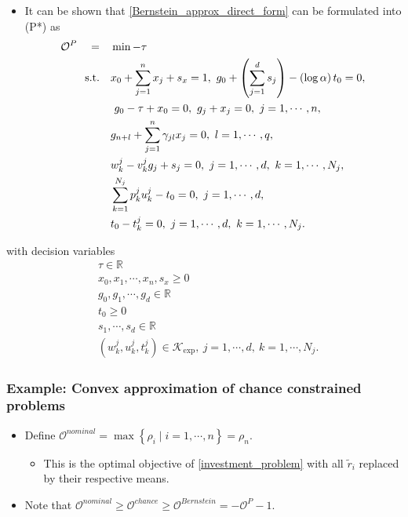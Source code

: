 \documentclass{beamer}
\begin{document}
\begin{frame}
	\begin{itemize}
		\item It can be shown that \eqref{Bernstein_approx_direct_form} can be formulated into (P*) as
		\begin{align}
		\begin{split}\label{reformulated_std_conic_form}
		\mathcal{O}^{P} \quad = \quad &\min  -\tau \\ 
		\textnormal{s.t.}\ \ \ & x_0 + \sum_{j=1}^n x_j + s_x = 1,\ g_0 + \left(\sum_{j=1}^d s_j\right) - \left(\log \alpha\right) t_0 = 0, \\
		&\ g_0  - \tau + x_0 = 0,\  g_j + x_j = 0,\ j = 1, \cdots, n,\\ 
		& g_{n+l} + \sum_{j=1}^n \gamma_{jl} x_j = 0,\ l = 1, \cdots, q, \\
		& w_k^j - v_k^j g_j + s_j = 0,\ j = 1, \cdots,d,\ k = 1, \cdots, N_j, \\
		& \sum_{k=1}^{N_j} p_k^j u_k^j - t_0 = 0,\  j =1,\cdots,d, \\
		& t_0 - t_k^j = 0,\ j = 1,\cdots, d,\ k = 1,\cdots,N_j.
		\end{split}
		\end{align}
	\end{itemize}
\end{frame}

\begin{frame}
	with decision variables
	\begin{align*}
	& \tau \in \mathbb{R} \\
	& x_0, x_1, \cdots, x_n, s_x \geq 0 \\
	& g_0, g_1, \cdots, g_d \in \mathbb{R} \\
	& t_0 \geq 0 \\
	& s_1, \cdots, s_d \in \mathbb{R} \\
	& \left(w_k^j, u_k^j, t_k^j\right) \in \mathcal{K}_{\exp},\ j = 1, \cdots, d,\ k = 1,\cdots, N_j.
	\end{align*}
\end{frame}

\begin{frame}
	\frametitle{Example: Convex approximation of chance constrained problems}
	\begin{itemize}
		\item Define $\mathcal{O}^{nominal} = \max\left\{\rho_i \mid i=1,\cdots,n\right\} = \rho_n$.
		\begin{itemize}
			\item This is the optimal objective of \eqref{investment_problem} with all $\tilde{r}_i$ replaced by their respective means.
		\end{itemize}
		\item Note that $\mathcal{O}^{nominal}\geq\mathcal{O}^{chance} \geq \mathcal{O}^{Bernstein} = -\mathcal{O}^P - 1$.
	\end{itemize}
\end{frame}
\end{document}
